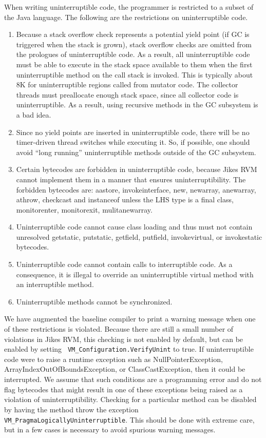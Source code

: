 When writing uninterruptible code, the programmer is restricted to a
subset of the Java language.  The following are the restrictions on
uninterruptible code.
\begin{enumerate}
\item{} Because a stack overflow check represents a potential yield
point (if GC is triggered when the stack is grown), stack overflow
checks are omitted from the prologues of uninterruptible code.  As a
result, all uninterruptible code must be able to execute in the
stack space available to them when the first uninterruptible method on
the call stack is invoked.  This is typically about 8K for
uninterruptible regions called from mutator code.  The collector
threads must preallocate enough stack space, since all collector code
is uninterruptible. As a result, using recursive methods in the GC
subsystem is a bad idea.
\item{} Since no yield points are inserted in uninterruptible code,
there will be no timer-driven thread switches while executing it.  So,
if possible, one should avoid ``long running'' uninterruptible methods
outside of the GC subsystem.
\item{} Certain bytecodes are forbidden in uninterruptible code,
because Jikes RVM cannot implement them in a manner that ensures
uninterruptibility. The forbidden bytecodes are: aastore,
invokeinterface, new, newarray, anewarray, athrow, checkcast and
instanceof unless the LHS type is a final class, monitorenter,
monitorexit, mulitanewarray. 
\item{} Uninterruptible code cannot cause class loading and thus must
not contain unresolved getstatic, putstatic, getfield, putfield,
invokevirtual, or invokestatic bytecodes. 
\item{} Uninterruptible code cannot contain calls to interruptible
code. As a consequence, it is illegal to override an uninterruptible
virtual method with an interruptible method.
\item{} Uninterruptible methods cannot be synchronized. 
\end{enumerate}
We have augmented the baseline compiler to print a warning message
when one of these restrictions is violated.  Because there are still a
small number of violations in Jikes RVM, this checking is not enabled
by default, but can be enabled by setting {\tt
VM\_Configuration.VerifyUnint} to  true. 
If uninterruptible code were to raise a runtime exception such
as NullPointerException, ArrayIndexOutOfBoundsException, or
ClassCastException, then it could be interrupted.  We assume that such
conditions are a programming error and do not flag bytecodes that
might result in one of these exceptions being raised as a violation of
uninterruptibility. Checking for a particular method can be disabled
by having the method throw the exception {\tt
VM\_PragmaLogicallyUninterruptible}. This should be done with extreme
care, but in a few cases is necessary to avoid spurious warning
messages. 

